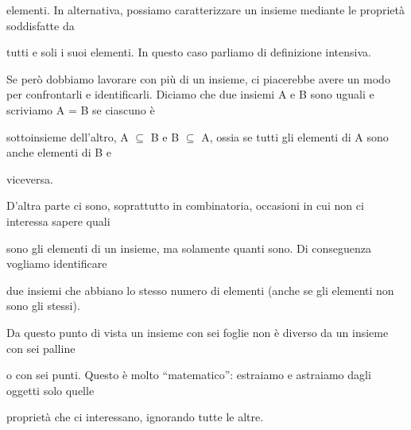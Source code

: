 \documentclass[a4paper,portrait,12pt]{article}
\begin{document}
\begin{flushleft}
elementi. In alternativa, possiamo caratterizzare un insieme mediante le propriet\`{a} soddisfatte da
\end{flushleft}


\begin{flushleft}
tutti e soli i suoi elementi. In questo caso parliamo di definizione intensiva.
\end{flushleft}


\begin{flushleft}
Se per\`{o} dobbiamo lavorare con più di un insieme, ci piacerebbe avere un modo per confrontarli e identificarli. Diciamo che due insiemi A e B sono uguali e scriviamo A = B se ciascuno \`{e}
\end{flushleft}


\begin{flushleft}
sottoinsieme dell'altro, A $\subseteq$ B e B $\subseteq$ A, ossia se tutti gli elementi di A sono anche elementi di B e
\end{flushleft}


\begin{flushleft}
viceversa.
\end{flushleft}


\begin{flushleft}
D'altra parte ci sono, soprattutto in combinatoria, occasioni in cui non ci interessa sapere quali
\end{flushleft}


\begin{flushleft}
sono gli elementi di un insieme, ma solamente quanti sono. Di conseguenza vogliamo identificare
\end{flushleft}


\begin{flushleft}
due insiemi che abbiano lo stesso numero di elementi (anche se gli elementi non sono gli stessi).
\end{flushleft}


\begin{flushleft}
Da questo punto di vista un insieme con sei foglie non \`{e} diverso da un insieme con sei palline
\end{flushleft}


\begin{flushleft}
o con sei punti. Questo \`{e} molto {``}matematico'': estraiamo e astraiamo dagli oggetti solo quelle
\end{flushleft}


\begin{flushleft}
propriet\`{a} che ci interessano, ignorando tutte le altre.
\end{flushleft}
\end{document}
